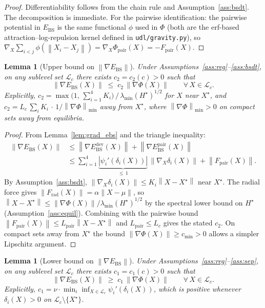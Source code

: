 \documentclass[11pt]{article}
\newtheorem{lemma}[theorem]{Lemma}
\theoremstyle{definition}
\newcommand{\Xst}{X^{\star}}
\newcommand{\grad}{\nabla}
\newcommand{\Ebs}{E_{\mathrm{BS}}}
\newcommand{\Lpair}{L_{\mathrm{pair}}}
\newcommand{\lmin}{\lambda_{\min}}
\newcommand{\norm}[1]{\left\|#1\right\|}
\begin{document}
\begin{proof}
Differentiability follows from the chain rule and Assumption~\ref{ass:bsdt}.
The decomposition is immediate.  For the pairwise identification: the pairwise
potential in $\Ebs$ is the same functional $\phi$ used in $\Phi$ (both are
the erf-based attraction--log-repulsion kernel defined in
\texttt{udl/gravity.py}), so
$\grad_X\sum_{i<j}\phi(\norm{X_i-X_j}) = \grad_X\Phi_{\mathrm{pair}}(X)
= -F_{\mathrm{pair}}(X)$.
\end{proof}

\begin{lemma}[Upper bound on $\norm{\grad\Ebs}$]
\label{lem:upper}
Under Assumptions~\ref{ass:reg}--\ref{ass:bsdt}, on any sublevel set
$\mathcal{L}_c$ there exists $c_2 = c_2(c) > 0$ such that
\[
  \norm{\grad\Ebs(X)} \;\le\; c_2\,\norm{\grad\Phi(X)}
  \qquad \forall\, X \in \mathcal{L}_c.
\]
Explicitly, $c_2 = \max\bigl(1,\, \sum_{i=1}^4 K_i\bigr)\, /\, \lmin(H^\star)^{1/2}$
for $X$ near $\Xst$, and $c_2 = L_c\,\sum_i K_i\,\cdot\,1/\norm{\grad\Phi}_{\min}$
away from $\Xst$, where $\norm{\grad\Phi}_{\min} > 0$ on compact sets away from
equilibria.
\end{lemma}

\begin{proof}
From Lemma~\ref{lem:grad_ebs} and the triangle inequality:
\begin{align*}
  \norm{\grad\Ebs(X)}
  &\le \norm{\grad\Ebs^{\mathrm{dev}}(X)} + \norm{\grad\Ebs^{\mathrm{pair}}(X)} \\
  &\le \sum_{i=1}^4 \underbrace{|\psi_i'(\delta_i(X))|}_{{\le\, 1}}\,
       \norm{\grad_X\delta_i(X)}
       + \norm{F_{\mathrm{pair}}(X)}.
\end{align*}
By Assumption~\ref{ass:bsdt}, $\norm{\grad_X\delta_i(X)} \le K_i\norm{X-\Xst}$
near $\Xst$.
The radial force gives $\norm{F_{\mathrm{rad}}(X)} = \alpha\norm{X - \mu}$, so
$\norm{X - \Xst} \le \norm{\grad\Phi(X)}/\lmin(H^\star)^{1/2}$ by the
spectral lower bound on $H^\star$ (Assumption~\ref{ass:equil}).  Combining
with the pairwise bound $\norm{F_{\mathrm{pair}}(X)} \le \Lpair\norm{X-\Xst}$
and $\Lpair \le L_c$ gives the stated $c_2$.
On compact sets away from $\Xst$ the bound $\norm{\grad\Phi(X)} \ge c_{\min} > 0$
allows a simpler Lipschitz argument.
\end{proof}

\begin{lemma}[Lower bound on $\norm{\grad\Ebs}$]
\label{lem:lower}
Under Assumptions~\ref{ass:reg}--\ref{ass:sep}, on any sublevel set
$\mathcal{L}_c$ there exists $c_1 = c_1(c) > 0$ such that
\[
  \norm{\grad\Ebs(X)} \;\ge\; c_1\,\norm{\grad\Phi(X)}
  \qquad \forall\, X \in \mathcal{L}_c.
\]
Explicitly, $c_1 = \nu \cdot \min_i\inf_{X\in\mathcal{L}_c}\psi_i'(\delta_i(X))$,
which is positive whenever $\delta_i(X) > 0$ on $\mathcal{L}_c\setminus\{\Xst\}$.
\end{lemma}
\end{document}

